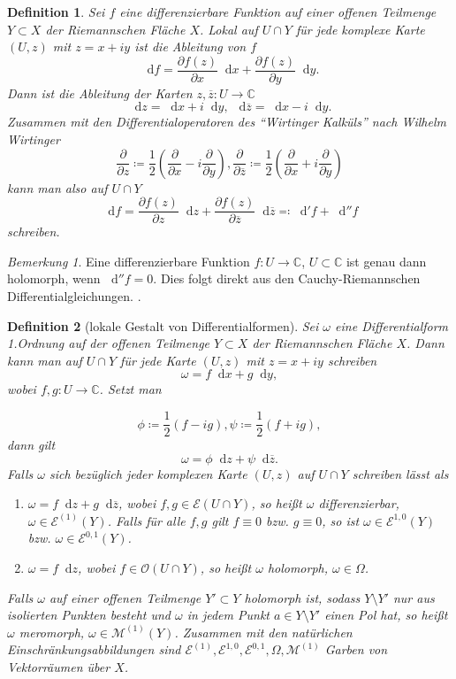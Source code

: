 \documentclass[11pt,a4paper,toc=bibliography]{scrartcl}
\theoremstyle{def}
\newtheorem{defi}{Definition}[section]
\theoremstyle{thm}
\theoremstyle{remark}
\newtheorem*{bem}{Bemerkung}
\newcommand*\dif{\mathop{}\!\mathrm{d}}\newcommand{\einschraenkung}{\,\rule[-5pt]{0.4pt}{12pt}\,{}} %
\begin{document}
\begin{defi}
	Sei $f$ eine differenzierbare Funktion auf einer offenen Teilmenge $Y\subset X$ der Riemannschen Fläche $X$. Lokal auf $U\cap Y$ für jede komplexe Karte $(U,z)$ mit $z=x+iy$ ist die Ableitung von $f$
	\[
	\dif f = \frac{\partial f(z)}{\partial x}\dif x +\frac{\partial f(z)}{\partial y}\dif y.
	\]
	Dann ist die Ableitung der Karten $z,\overline{z}:U\rightarrow \mathbb{C}$
	\[
	\dif z = \dif x +i\dif y,~ \dif \overline{z}=\dif x-i\dif y.
	\]
	Zusammen mit den Differentialoperatoren des "`Wirtinger Kalküls"' nach Wilhelm Wirtinger
	\[
	\frac{\partial}{\partial z}\coloneqq \frac{1}{2}\left(\frac{\partial}{\partial x}-i\frac{\partial}{\partial y}\right), \frac{\partial}{\partial \overline{z}}\coloneqq \frac{1}{2}\left(\frac{\partial}{\partial x}+i\frac{\partial}{\partial y}\right)
	\] 
	kann man also auf $U\cap Y$
	\[
	\dif f = \frac{\partial f(z)}{\partial z}\dif z+\frac{\partial f(z)}{\partial \overline{z}}\dif \overline{z}\eqqcolon \dif' f+\dif'' f
	\]
	schreiben. 
\end{defi}
\begin{bem}
    Eine differenzierbare Funktion $f:U\rightarrow \mathbb{C}$, $U\subset\mathbb{C}$ ist genau dann holomorph, wenn $\dif '' f =0$. Dies folgt direkt aus den Cauchy-Riemannschen Differentialgleichungen. \cite[~S.8]{funktheo}.
\end{bem}

\begin{defi}[lokale Gestalt von Differentialformen]
Sei $\omega $ eine Differentialform 1.Ordnung auf der offenen Teilmenge $Y\subset X$ der Riemannschen Fläche $X$. Dann kann man auf $U\cap Y$ für jede Karte $(U,z)$ mit $z=x+iy$ schreiben
\[
\omega = f\dif x+g\dif y,
\]
wobei $f,g:U\rightarrow \mathbb{C}$. Setzt man

	\[
\phi \coloneqq \frac{1}{2}\left(f-ig\right), \psi \coloneqq \frac{1}{2}\left(f+ig\right),
\]  
dann gilt
\[
\omega = \phi\dif z+\psi\dif\overline{z}.
\]
Falls $\omega $ sich bezüglich jeder komplexen Karte $(U,z)$ auf $U\cap Y$ schreiben lässt als
\begin{enumerate}
	\item $\omega = f\dif z+g\dif \overline{z}$, wobei $f,g\in \mathcal{E}(U\cap Y)$, so heißt $\omega$ \emph{differenzierbar}, $\omega\in \mathcal{E}^{(1)}(Y)$. Falls für alle $f,g$ gilt $f\equiv 0$ bzw. $g\equiv 0$, so ist $\omega \in \mathcal{E}^{1,0}(Y)$ bzw. $\omega \in \mathcal{E}^{0,1}(Y)$.
	\item $\omega = f\dif z$, wobei $f\in\mathcal{O}(U\cap Y)$, so heißt $\omega$ \emph{holomorph},
	$\omega\in \Omega$.
\end{enumerate}
Falls $\omega$ auf einer offenen Teilmenge $Y'\subset Y$ holomorph ist, sodass $Y\setminus Y'$ nur aus isolierten Punkten besteht und $\omega$ in jedem Punkt $a\in Y\setminus Y'$ einen Pol hat, so heißt $\omega$ \emph{meromorph}, $\omega \in \mathcal{M}^{(1)}(Y)$.
Zusammen mit den natürlichen Einschränkungsabbildungen sind $\mathcal{E}^{(1)},\mathcal{E}^{1,0},\mathcal{E}^{0,1},\Omega,\mathcal{M}^{(1)} $ Garben von Vektorräumen über $X$.
\end{defi}
\end{document}
